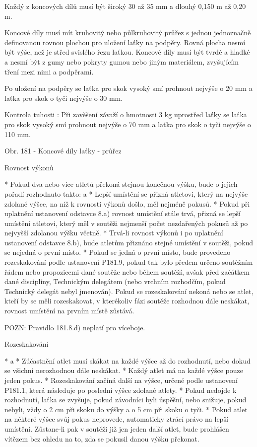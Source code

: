 Každý z koncových dílů musí být široký 30 až 35 mm a dlouhý 0,150 m až 0,20 m.

Koncové díly musí mít kruhovitý nebo půlkruhovitý průřez s jednou jednoznačně definovanou rovnou plochou pro uložení laťky na podpěry. Rovná plocha nesmí být výše, než je střed svislého řezu laťkou. Koncové díly musí být tvrdé a hladké a nesmí být z gumy nebo pokryty gumou nebo jiným materiálem, zvyšujícím tření mezi nimi a podpěrami.

Po uložení na podpěry se laťka pro skok vysoký smí prohnout nejvýše o 20 mm a laťka pro skok o tyči nejvýše o 30 mm.

Kontrola tuhosti : Při zavěšení závaží o hmotnosti 3 kg uprostřed laťky se laťka pro skok vysoký smí prohnout nejvýše o 70 mm a laťka pro  skok o tyči nejvýše o 110 mm.

Obr. 181 - Koncové díly laťky - průřez

Rovnost výkonů

* Pokud dva nebo více atletů překoná stejnou konečnou výšku, bude o jejich pořadí rozhodnuto takto:
  \begitems \style a
  * Lepší umístění se přizná atletovi, který na nejvýše zdolané výšce, na níž k rovnosti výkonů došlo, měl nejméně pokusů.
  * Pokud při uplatnění ustanovení odstavce 8.a) rovnost umístění stále trvá, přizná se lepší umístění atletovi, který měl v soutěži nejmenší počet nezdařených pokusů až po nejvyšší zdolanou výšku včetně.
  * Trvá-li rovnost výkonů i po uplatnění ustanovení odstavce 8.b), bude atletům přiznáno stejné umístění v soutěži, pokud se nejedná o první místo.
  * Pokud se jedná o první místo, bude provedeno rozeskakování podle ustanovení P181.9, pokud tak bylo předem určeno soutěžním řádem nebo propozicemi dané soutěže nebo během soutěží, avšak před začátkem dané disciplíny, Technickým delegátem (nebo vrchním rozhodčím, pokud Technický delegát nebyl jmenován). Pokud se rozeskakování nekoná nebo se atlet, kteří by se měli rozeskakovat, v kterékoliv fázi soutěže rozhodnou dále neskákat, rovnost umístění na prvním místě zůstává.
  \enditems

POZN: Pravidlo 181.8.d) neplatí pro víceboje.

Rozeskakování

* \begitems \style a
  * Zúčastnění atlet musí skákat na každé výšce až do rozhodnutí, nebo dokud se všichni nerozhodnou dále neskákat.
  * Každý atlet má na každé výšce pouze jeden pokus.
  * Rozeskakování začíná další na výšce, určené podle ustanovení P181.1, která následuje po poslední výšce zdolané atlety.
  * Pokud nedojde k rozhodnutí, laťka se zvyšuje, pokud závodníci byli úspěšní, nebo snižuje, pokud nebyli, vždy o 2 cm při skoku do výšky a o 5 cm při skoku o tyči.
  * Pokud atlet na některé výšce svůj pokus neprovede, automaticky ztrácí právo na lepší umístění. Zůstane-li pak v soutěži již jen jeden další atlet, bude prohlášen vítězem bez ohledu na to, zda se pokusil danou výšku překonat.
  \enditems

